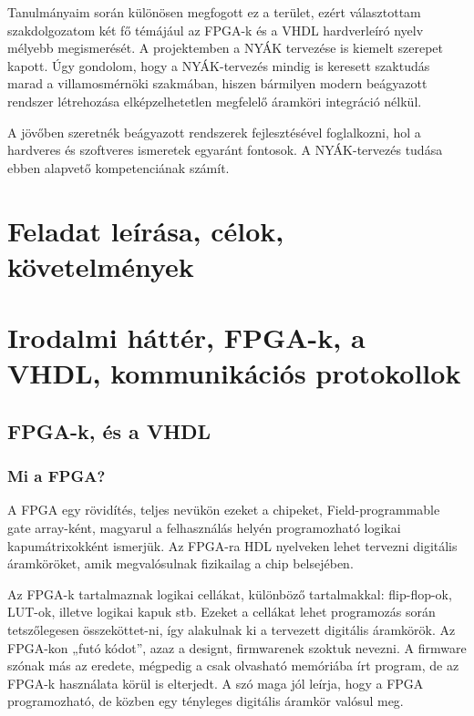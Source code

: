 \documentclass[a4paper,12pt,oneside]{book}
\begin{document}
Tanulmányaim során különösen megfogott ez a terület, ezért választottam szakdolgozatom két fő témájául az FPGA-k és a VHDL hardverleíró nyelv mélyebb megismerését. A projektemben a NYÁK tervezése is kiemelt szerepet kapott. Úgy gondolom, hogy a NYÁK-tervezés mindig is keresett szaktudás marad a villamosmérnöki szakmában, hiszen bármilyen modern beágyazott rendszer létrehozása elképzelhetetlen megfelelő áramköri integráció nélkül. 

A jövőben szeretnék beágyazott rendszerek fejlesztésével foglalkozni, hol a hardveres és szoftveres ismeretek egyaránt fontosok. A NYÁK-tervezés tudása ebben alapvető kompetenciának számít.

\chapter{Feladat leírása, célok, követelmények}



\chapter{Irodalmi háttér, FPGA-k, a VHDL, kommunikációs protokollok}
\section{FPGA-k, és a VHDL}
\subsection{Mi a FPGA?}

A FPGA egy rövidítés, teljes nevükön ezeket a chipeket, Field-programmable gate array-ként, magyarul a felhasználás helyén programozható logikai kapumátrixokként ismerjük. Az FPGA-ra HDL nyelveken lehet tervezni digitális áramköröket, amik megvalósulnak fizikailag a chip belsejében. 

Az FPGA-k tartalmaznak logikai cellákat, különböző tartalmakkal: flip-flop-ok, LUT-ok, illetve logikai kapuk stb. Ezeket a cellákat lehet programozás során tetszőlegesen összeköttet-ni, így alakulnak ki a tervezett digitális áramkörök. Az FPGA-kon „futó kódot”, azaz a designt, firmwarenek szoktuk nevezni. A firmware szónak más az eredete, mégpedig a csak olvasható memóriába írt program, de az FPGA-k használata körül is elterjedt. A szó maga jól leírja, hogy a FPGA programozható, de közben egy tényleges digitális áramkör valósul meg.
\end{document}
